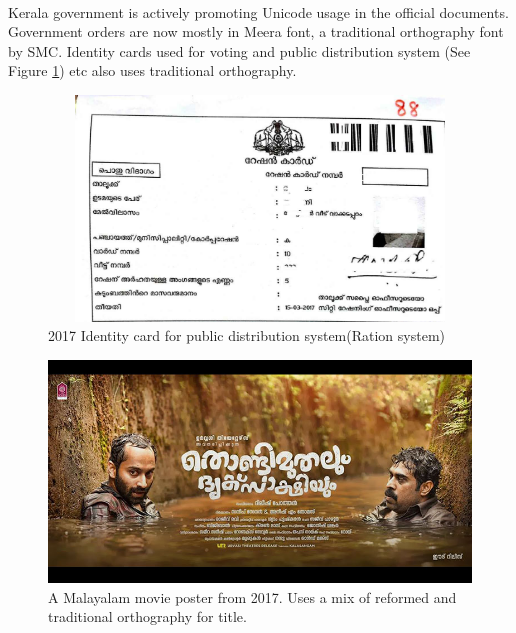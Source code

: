 \documentclass[10pt]{article}
\begin{document}
\paragraph{}
Kerala government is actively promoting Unicode usage in the official documents. Government orders are now mostly in Meera font, a traditional orthography font by SMC. Identity cards used for voting and public distribution system (See Figure \ref{rationcard}) etc also uses traditional orthography.

\begin{figure}[h!]
 \centering
  \includegraphics[width=1.0\textwidth,height=6cm ]{images/2017-rationcard.jpg}
   \caption{2017 Identity card for public distribution system(Ration system)}
  \label{rationcard}
\end{figure}


\begin{figure}[H]
 \centering
  \includegraphics[width=1.0\textwidth]{images/2017-movieposter-Thondimuthal}
 \caption{A Malayalam movie poster from 2017. Uses a mix of reformed and traditional orthography for title.}
 \label{thondi}
\end{figure}
\end{document}
